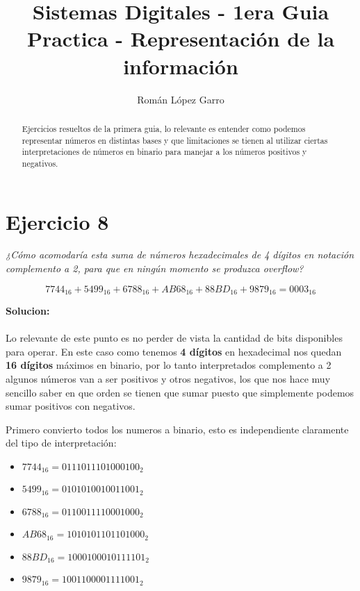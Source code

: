 \documentclass[12pt]{article}
\title{Sistemas Digitales - 1era Guia Practica - Representación de la información}
\author{Román López Garro}
\begin{document}
\maketitle

\begin{abstract}
    Ejercicios resueltos de la primera guia, lo relevante es entender como podemos representar números en distintas bases y que limitaciones se tienen al utilizar ciertas interpretaciones de números en binario para manejar a los números positivos y negativos.
\end{abstract}

\tableofcontents

\newpage

\section*{Ejercicio 8}

\textit{¿Cómo acomodaría esta suma de números hexadecimales de 4 dígitos en notación complemento a 2, para que en ningún momento se produzca \textit{overflow}?}

\[
7744_{16} + 5499_{16} + 6788_{16} + \mathit{AB68}_{16} + \mathit{88BD}_{16} + 9879_{16} = 0003_{16}
\]

\textbf{Solucion: } \\
                    \\
                    Lo relevante de este punto es no perder de vista la cantidad de bits disponibles para operar. En este caso como tenemos \textbf{4 dígitos} en hexadecimal nos quedan \textbf{16 dígitos} máximos en binario, por lo tanto interpretados complemento a 2 algunos números van a ser positivos y otros negativos, los que nos hace muy sencillo saber en que orden se tienen que sumar puesto que simplemente podemos sumar positivos con negativos.

Primero convierto todos los numeros a binario, esto es independiente claramente del tipo de interpretación:

\begin{itemize}
    \item[] $7744_{16} = 0111 0111 0100 0100_{2}$
    \item[] $5499_{16} = 0101 0100 1001 1001_{2}$
    \item[] $6788_{16} = 0110 0111 1000 1000_{2}$
    \item[] $AB68_{16} = 1010 1011 0110 1000_{2}$
    \item[] $88BD_{16} = 1000 1000 1011 1101_{2} $
    \item[] $9879_{16} = 1001 1000 0111 1001_{2}$
\end{itemize}
\end{document}
